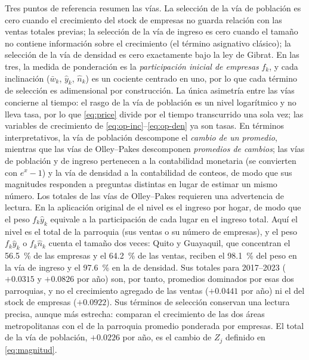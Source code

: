 \documentclass[12pt,a4paper]{article}
\begin{document}
Tres puntos de referencia resumen las vías. La selección de la vía de población es cero cuando el crecimiento del stock de empresas no guarda relación con las ventas totales previas; la selección de la vía de ingreso es cero cuando el tamaño no contiene información sobre el crecimiento (el término asignativo clásico); la selección de la vía de densidad es cero exactamente bajo la ley de Gibrat. En las tres, la medida de ponderación es la \textit{participación inicial de empresas} $f_k$, y cada inclinación ($\bar w_k$, $\hat y_k$, $\hat n_k$) es un cociente centrado en uno, por lo que cada término de selección es adimensional por construcción. La única asimetría entre las vías concierne al tiempo: el rasgo de la vía de población es un nivel logarítmico y no lleva tasa, por lo que \eqref{eq:price} divide por el tiempo transcurrido una sola vez; las variables de crecimiento de \eqref{eq:op-inc}--\eqref{eq:op-den} ya son tasas. En términos interpretativos, la vía de población descompone el \textit{cambio de un promedio}, mientras que las vías de Olley--Pakes descomponen \textit{promedios de cambios}; las vías de población y de ingreso pertenecen a la contabilidad monetaria (se convierten con $e^x - 1$) y la vía de densidad a la contabilidad de conteos, de modo que sus magnitudes responden a preguntas distintas en lugar de estimar un mismo número. Los totales de las vías de Olley--Pakes requieren una advertencia de lectura. En la aplicación original de \textcite{kemp2025} el nivel es el ingreso por hogar, de modo que el peso $f_k \hat y_k$ equivale a la participación de cada lugar en el ingreso total. Aquí el nivel es el total de la parroquia (sus ventas o su número de empresas), y el peso $f_k \hat y_k$ o $f_k \hat n_k$ cuenta el tamaño dos veces: Quito y Guayaquil, que concentran el 56.5~\% de las empresas y el 64.2~\% de las ventas, reciben el 98.1~\% del peso en la vía de ingreso y el 97.6~\% en la de densidad. Sus totales para 2017--2023 ($+0.0315$ y $+0.0826$ por año) son, por tanto, promedios dominados por esas dos parroquias, y no el crecimiento agregado de las ventas ($+0.0441$ por año) ni el del stock de empresas ($+0.0922$). Sus términos de selección conservan una lectura precisa, aunque más estrecha: comparan el crecimiento de las dos áreas metropolitanas con el de la parroquia promedio ponderada por empresas. El total de la vía de población, $+0.0226$ por año, es el cambio de $Z_j$ definido en \eqref{eq:magnitud}.
\par
\end{document}
